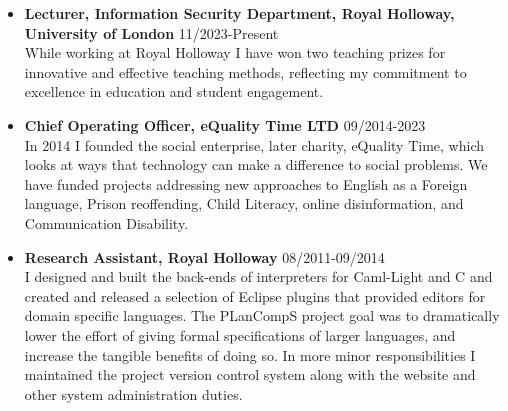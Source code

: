 \documentclass[10pt]{article}
\newenvironment{outerlist}[1][\enskip\textbullet]%
        {\begin{itemize}[#1]}{\end{itemize}%
         \vspace{-.6\baselineskip}}
\begin{document}
\vspace{-0.75cm}
\begin{outerlist}


\item[] {\bf Lecturer, Information Security Department, Royal Holloway, University of London} \hfill 11/2023-Present \\
While working at Royal Holloway I have won two teaching prizes for innovative and effective teaching methods, reflecting my commitment to excellence in education and student engagement.

\item[] {\bf Chief Operating Officer, eQuality Time LTD} \hfill 09/2014-2023 \\
In 2014 I founded the social enterprise, later charity, eQuality Time, which  looks at ways that technology can make a difference to social problems. We have funded projects addressing new approaches to English as a Foreign language, Prison reoffending, Child Literacy, online disinformation, and Communication Disability.  


\item[] {\bf Research Assistant, Royal Holloway} \hfill 08/2011-09/2014 \\
I designed and built the back-ends of interpreters for Caml-Light and C and created and released a selection of Eclipse plugins that provided editors for domain specific languages.  The PLanCompS project goal was to dramatically lower the effort of giving formal specifications of larger languages, and increase the tangible benefits of doing so. In more minor responsibilities I maintained the project version control system along with the website and other system administration duties.  


\end{outerlist}
\end{document}
